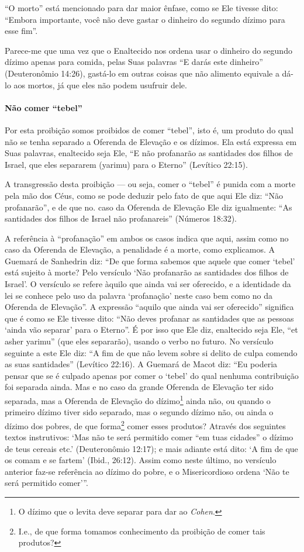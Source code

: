 ``O morto'' está mencionado para dar maior ênfase, como se Ele tivesse
dito: ``Embora importante, você não deve gastar o dinheiro do segundo
dízimo para esse fim''.

Parece-me que uma vez que o Enaltecido nos ordena usar o dinheiro do
segundo dízimo apenas para comida, pelas Suas palavras ``E darás este
dinheiro'' (Deuteronômio 14:26), gastá-lo em outras coisas que não
alimento equivale a dá-lo aos mortos, já que eles não podem usufruir
dele.

\paragraph{Não comer ``tebel''}

Por esta proibição somos proibidos de comer ``tebel'', isto é, um
produto do qual não se tenha separado a Oferenda de Elevação e os
dízimos. Ela está expressa em Suas palavras, enaltecido seja Ele, ``E
não profanarão as santidades dos filhos de Israel, que eles separarem
(yarimu) para o Eterno'' (Levítico 22:15).

A transgressão desta proibição --- ou seja, comer o ``tebel'' é punida
com a morte pela mão dos Céus, como se pode deduzir pelo fato de que
aqui Ele diz: ``Não profanarão'', e de que no. caso da Oferenda de
Elevação Ele diz igualmente: ``As santidades dos filhos de Israel não
profanareis'' (Números 18:32).

A referência à ``profanação'' em ambos os casos indica que aqui, assim
como no caso da Oferenda de Elevação, a penalidade é a morte, como
explicamos.
A Guemará de Sanhedrin diz: ``De que forma sabemos que aquele
que comer `tebel' está sujeito à morte? Pelo versículo `Não profanarão
as santidades dos filhos de Israel'. O versículo se refere àquilo que
ainda vai ser oferecido, e a identidade da lei se conhece pelo uso da
palavra `profanação' neste caso bem como no da Oferenda de Elevação''. A
expressão ``aquilo que ainda vai ser oferecido'' significa que é como se
Ele tivesse dito: ``Não deves profanar as santidades que as pessoas
`ainda vão separar' para o Eterno''. É por isso que Ele diz, enaltecido
seja Ele, ``et asher yarimu'' (que eles separarão), usando o verbo no
futuro. No versículo seguinte a este Ele diz: ``A fim de que não levem
sobre si delito de culpa comendo as suas santidades'' (Levítico 22:16).
A Guemará de Macot diz: ``Eu poderia pensar que se é culpado apenas por
comer o `tebel' do qual nenhuma contribuição foi separada ainda. Mas
e no caso da grande Oferenda de Elevação ter sido separada, mas a
Oferenda de Elevação do dízimo\footnote{O dízimo que o levita deve separar para dar ao \textit{Cohen}.} ainda não, ou quando o
primeiro dízimo tiver sido separado, mas o segundo dízimo não, ou ainda
o dízimo dos pobres, de que forma\footnote{I.e., de que forma tomamos conhecimento da proibição de comer tais
  produtos?} comer esses
produtos? Através dos seguintes textos instrutivos: `Mas não te será
permitido comer ``em tuas cidades'' o dízimo de teus cereais etc.'
(Deuteronômio 12:17); e mais adiante está dito: `A fim de que os comam e
se fartem' (Ibid., 26:12). Assim como neste último, no versículo
anterior faz-se referência ao dízimo do pobre, e o Misericordioso ordena
`Não te será permitido comer'''.

